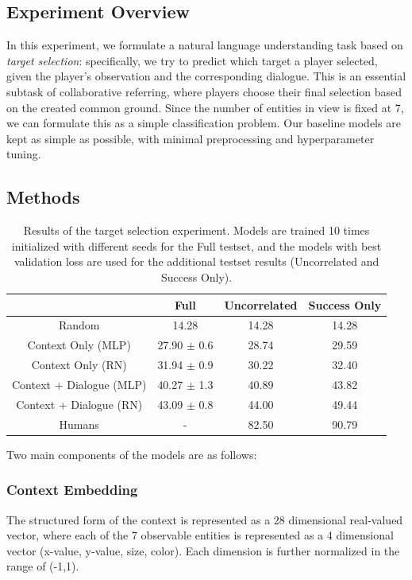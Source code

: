 \documentclass[letterpaper]{article}
\begin{document}
\subsection{Experiment Overview}

In this experiment, we formulate a natural language understanding task based on \textit{target selection}: specifically, we try to predict which target a player selected, given the player's observation and the corresponding dialogue. This is an essential subtask of collaborative referring, where players choose their final selection based on the created common ground. Since the number of entities in view is fixed at 7, we can formulate this as a simple classification problem. Our baseline models are kept as simple as possible, with minimal preprocessing and hyperparameter tuning.

\subsection{Methods}

\begin{table}[htb!]
\centering \small
\begin{adjustbox}{width=0.43\columnwidth}
\begin{tabular}{c|ccc}
\toprule
 & Full & Uncorrelated & Success Only \\
\midrule
Random & 14.28 & 14.28 & 14.28 \\
\midrule
Context Only (MLP) & 27.90 $\pm$ 0.6 & 28.74 & 29.59 \\
Context Only (RN) & 31.94 $\pm$ 0.9 & 30.22 & 32.40 \\
Context + Dialogue (MLP) & 40.27 $\pm$ 1.3 & 40.89 & 43.82 \\
Context + Dialogue (RN) & 43.09 $\pm$ 0.8 & 44.00 & 49.44 \\
\midrule
Humans & - & 82.50 & 90.79 \\
\bottomrule
\end{tabular}
\end{adjustbox}
\caption{\label{selection_experiment}
Results of the target selection experiment. Models are trained 10 times initialized with different seeds for the Full testset, and the models with best validation loss are used for the additional testset results (Uncorrelated and Success Only).
}
\end{table}

Two main components of the models are as follows:

\subsubsection{Context Embedding}
The structured form of the context is represented as a 28 dimensional real-valued vector, where each of the 7 observable entities is represented as a 4 dimensional vector (x-value, y-value, size, color). Each dimension is further normalized in the range of (-1,1).
\end{document}
